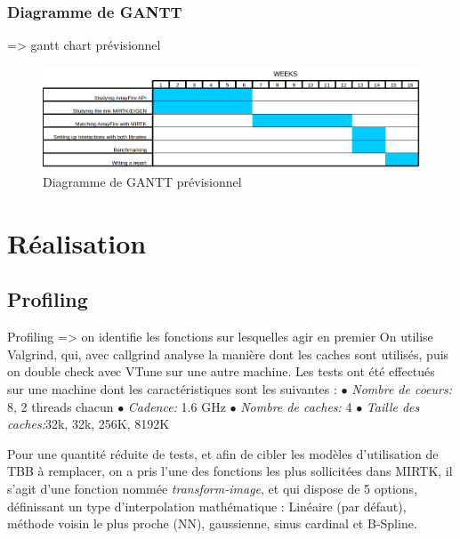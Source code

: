 \documentclass[12pt]{report}
\begin{document}
	\subsection{Diagramme de GANTT}
	 => gantt chart prévisionnel
	\begin{figure}[h!]
		\begin{center}
			\includegraphics[width=18cm]{Reports/figures/estimated_gantt.png}
		\end{center}	
		\caption{Diagramme de GANTT prévisionnel}
		\label{Diagramme de GANTT prévisionnel}
	\end{figure}
\chapter{Réalisation}
	\section{Profiling}
	Profiling => on identifie les fonctions sur lesquelles agir en premier
	On utilise Valgrind, qui, avec callgrind analyse la manière dont les caches sont utilisés, puis on double check avec VTune sur une autre machine.
	\newline\newline
	Les tests ont été effectués sur une machine dont les caractéristiques sont les suivantes : \newline
	{$\bullet$} \textit{Nombre de coeurs:} 8, 2 threads chacun\newline
	{$\bullet$} \textit{Cadence:} 1.6 GHz \newline
	{$\bullet$} \textit{Nombre de caches:} 4 \newline
	{$\bullet$} \textit{Taille des caches:}32k, 32k, 256K, 8192K \newline
	
	Pour une quantité réduite de tests, et afin de cibler les modèles d'utilisation de TBB à remplacer, on a pris l'une des fonctions les plus sollicitées dans MIRTK, il s'agit d'une fonction nommée \textit{transform-image}, et qui dispose de 5 options, définissant un type d'interpolation mathématique : Linéaire (par défaut), méthode voisin le plus proche (NN), gaussienne, sinus cardinal et B-Spline. 
	
\end{document}

